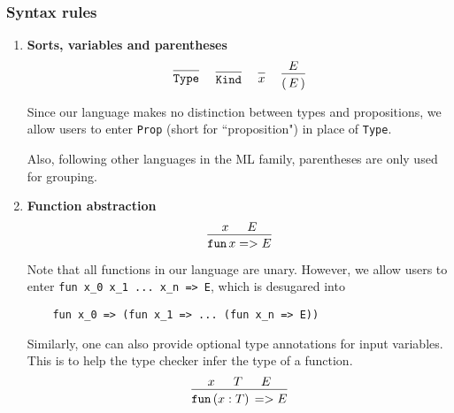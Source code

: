 \documentclass{article}
\begin{document}

\subsubsection{Syntax rules}
\begin{enumerate}
\item \textbf{Sorts, variables and parentheses} \\
  \begin{gather*}
    \begin{prooftree}
      \infer0{\Type}
    \end{prooftree}
    ~ \quad
    \begin{prooftree}
      \infer0{\Kind}
    \end{prooftree}
    ~ \quad
    \begin{prooftree}
      \infer0{x}
    \end{prooftree}
    ~ \quad
    \begin{prooftree}
      \hypo{E}
      \infer1{( \, E \, )}
    \end{prooftree}
  \end{gather*}

  Since our language makes no distinction between types and propositions,
  we allow users to enter \verb|Prop| (short for ``proposition") in place of 
  \verb|Type|.

  Also, following other languages in the ML family, parentheses are only used
  for grouping.

\item \textbf{Function abstraction} \\
  \[
    \begin{prooftree}
      \hypo{x}
      \hypo{E}
      \infer2{\fun \, x => E}
    \end{prooftree}
  \]

  Note that all functions in our language are unary. However, we allow users
  to enter \verb|fun x_0 x_1 ... x_n => E|, which is desugared into
  \begin{verbatim}
    fun x_0 => (fun x_1 => ... (fun x_n => E))
  \end{verbatim}

  Similarly, one can also provide optional type annotations for input variables.
  This is to help the type checker infer the type of a function.
  \[
    \begin{prooftree}
      \hypo{x}
      \hypo{T}
      \hypo{E}
      \infer3{\fun \, (x : T) \, => E}
    \end{prooftree}
  \]


\end{enumerate}
\end{document}
